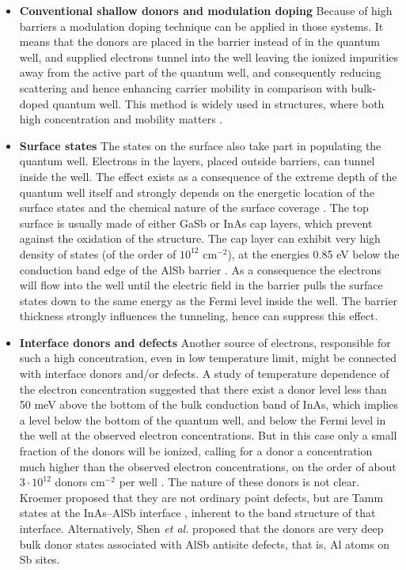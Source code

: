 \documentclass[titlepage,a4paper]{book}
\newcommand{\wciecie}{\quad\phantom{v}}
\begin{document}
\begin{itemize}
\item \textbf{Conventional shallow donors and modulation doping} \newline 
\wciecie
Because of high barriers a modulation doping technique can be applied in those systems. It means that the donors are placed in the barrier instead of in the quantum well, and supplied electrons tunnel into the well leaving the ionized impurities away from the active part of the quantum well, and consequently reducing scattering and hence enhancing carrier mobility in comparison with bulk-doped quantum well. This method is widely used in structures, where both high concentration and mobility matters \cite{Kroemer_review}.

\item \textbf{Surface states} \newline
\wciecie
The states on the surface also take part in populating the quantum well. Electrons in the layers, placed outside barriers, can tunnel inside the well. The effect exists as a consequence of the extreme depth of the quantum well itself and strongly depends on the energetic location of the surface states and the chemical nature of the surface coverage \cite{Kroemer_review}. The top surface is usually made of either GaSb or InAs cap layers, which prevent against the oxidation of the structure. The cap layer can exhibit very high density of states (of the order of $10^{12}$ cm$^{-2}$), at the energies 0.85 eV below the conduction band edge of the AlSb barrier \cite{Nguyen_SurfaceDonor}. As a consequence the electrons will flow into the well until the electric field in the barrier pulls the surface states down to the same energy as the Fermi level inside the well. The barrier thickness strongly influences the tunneling, hence can suppress this effect.

\item \textbf{Interface donors and defects} \newline
\wciecie
Another source of electrons, responsible for such a high concentration, even in low temperature limit, might be connected with interface donors and/or defects. A study of temperature dependence of the electron concentration suggested that there exist a donor level less than 50 meV above the bottom of the bulk conduction band of InAs, which implies a level below the bottom of the quantum well, and
below the Fermi level in the well at the observed electron concentrations. But in this case only a small fraction of the donors will be ionized, calling for a donor a concentration much higher than the observed electron concentrations, on the order of about $3 \cdot 10^{12}$ donors cm$^{-2}$ per well \cite{Kroemer_review}. The nature of these donors is not clear. Kroemer proposed that they are not ordinary point defects, but are Tamm states at the InAs–AlSb interface \cite{Kroemer_TammStates}, inherent to the band structure of that interface. Alternatively, Shen \textit{et al.} \cite{Shen_TammStates} proposed that the donors are very deep bulk donor states associated with AlSb antisite defects, that is, Al atoms on Sb sites.
\end{itemize}
\end{document}

